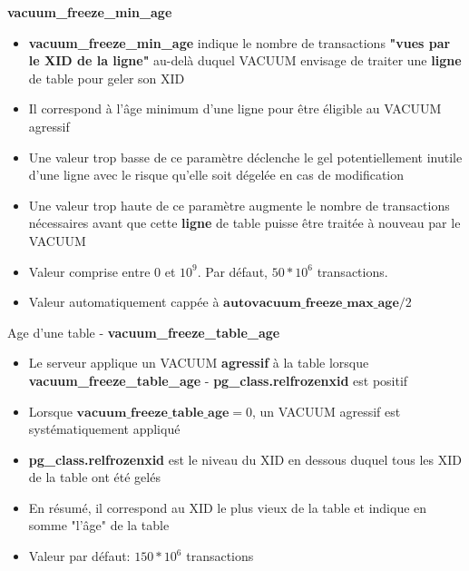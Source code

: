 
\begin{frame}{\textbf{vacuum\_freeze\_min\_age}}

\begin{itemize}
   \item \textbf{vacuum\_freeze\_min\_age} indique le nombre de transactions \textbf{"vues par le XID de la ligne"} au-delà duquel VACUUM envisage de traiter une \textbf{ligne} de table pour geler son XID
   \item Il correspond à l'âge minimum d'une ligne pour être éligible au VACUUM agressif
   \item Une valeur trop basse de ce paramètre déclenche le gel \textsf{potentiellement inutile} d'une ligne avec le risque qu'elle soit dégelée en cas de modification
   \item Une valeur trop haute de ce paramètre augmente le nombre de transactions nécessaires avant que cette \textbf{ligne} de table puisse être traitée à nouveau par le VACUUM
   \item Valeur comprise entre 0 et $10^{9}$. Par défaut, $50*10^{6}$ transactions.
   \item Valeur automatiquement cappée à $\textbf{autovacuum\_freeze\_max\_age}/2$
\end{itemize}

\begin{toile}
\end{toile}

\end{frame}


\begin{frame}{Age d'une table - \textbf{vacuum\_freeze\_table\_age}}

\begin{itemize}
   \item Le serveur applique un VACUUM \textbf{agressif} à la table lorsque \textbf{vacuum\_freeze\_table\_age} - \textbf{pg\_class.relfrozenxid} est positif
   \item Lorsque $\textbf{vacuum\_freeze\_table\_age} = 0$, un VACUUM agressif est systématiquement appliqué
   \item \textbf{pg\_class.relfrozenxid} est le niveau du XID en dessous duquel tous les XID de la table ont été gelés
   \item En résumé, il correspond au XID le plus vieux de la table et indique en somme "l'âge" de la table
   \item Valeur par défaut: $150 * 10^6$ transactions
\end{itemize}

\begin{toile}
\end{toile}

\end{frame}

